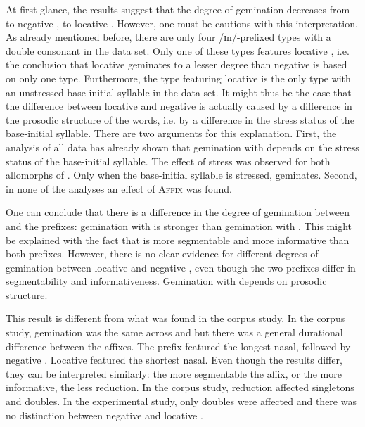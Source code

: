 At first glance, the results suggest that the degree of gemination decreases from  to negative , to locative .  However, one must be cautions with this interpretation. As already mentioned before, there are only four /ɪn/-prefixed types with a double consonant in the data set. Only one of these types features locative , i.e. the conclusion that locative  geminates to a lesser degree than negative  is based on only one type. Furthermore, the type featuring locative  is the only type with an unstressed base-initial syllable in the data set. 
It might thus be the case that the difference between locative and negative  is actually caused by a difference in the prosodic structure of the words, i.e. by a difference in the stress status of the base-initial syllable. There are two arguments for this explanation. First, the analysis of all data has already shown that gemination with  depends on the stress status of the base-initial syllable. The effect of stress was observed for both allomorphs of  . Only when the base-initial syllable is stressed,  geminates. 
 Second, in none of the analyses an effect of \textsc{Affix} was found. 


One can conclude that there is a difference in the degree of gemination between  and the prefixes: gemination with  is stronger than gemination with . This might be explained with the fact that  is more segmentable and more informative than both prefixes. However, there is no clear evidence for different degrees of gemination between  locative  and negative , even though the two prefixes differ in segmentability and informativeness. Gemination with  depends on prosodic structure.

 This result is different from what was found in the corpus study. In the corpus study, gemination was the same across  and  but there was a general durational difference between the affixes. The prefix  featured the longest nasal, followed by negative . Locative  featured the shortest nasal. 
Even though the results differ, they can be interpreted similarly: the more segmentable the affix, or the more informative, the less reduction. In the corpus study,  reduction affected singletons and doubles. In the experimental study, only doubles were affected and there was no distinction between negative and locative .






